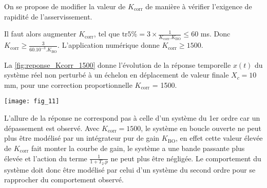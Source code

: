 \begin{multicols}{2}
\ifprof
\else
\vspace*{1em}
On se propose de modifier la valeur de $K_{\text{corr}}$ de manière à vérifier l'exigence de rapidité de l'asservissement.
\fi


\ifprof
\begin{corrige}
Il faut alors augmenter $K_{\text{corr}}$, tel que tr$5\% = 3 \times \frac{1}{K_{\text{corr}}.K_{\text{BO}}} \le 60$ ms. Donc \\
$K_{\text{corr}} \ge \frac{3}{60.10^{-3}.K_{\text{BO}}}$.
L'application numérique donne $K_{\text{corr}} \ge  1500$.
\end{corrige}
\fi


\ifprof
\else
La \ref{fig:reponse_Kcorr_1500}  donne l'évolution de la réponse temporelle $x(t)$ du système réel non perturbé à un échelon en déplacement de valeur finale $X_c = 10$ mm, pour une correction proportionnelle $K_{\text{corr}}$ = \num{1500}.


\begin{center}%


\texttt{[image: fig\_11]}
\end{center}
\fi



\ifprof
\begin{corrige}
L'allure de la réponse ne correspond pas à celle d'un système du 1er ordre car un dépassement est observé. Avec $K_{\text{corr}} = 1500$, le système en boucle ouverte ne peut plus être modélisé par un intégrateur pur de gain $K_{\text{BO}}$, en effet cette valeur élevée de $K_{\text{corr}}$ fait monter la courbe de gain, le système a une bande passante plus élevée et l'action du terme $\frac{1}{1+T_2.p}$ ne peut plus être négligée. Le comportement du système doit donc être modélisé par celui d'un système du second ordre pour se rapprocher du comportement observé.
\end{corrige}
\fi


\end{multicols}
